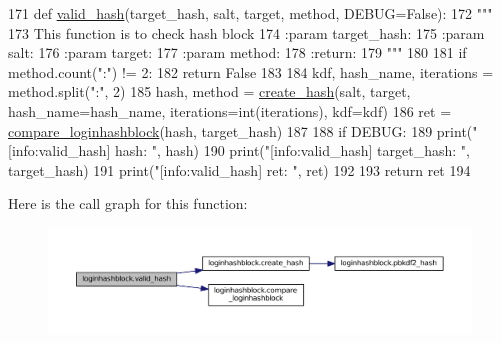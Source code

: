 \begin{DoxyCode}
171 \textcolor{keyword}{def }\hyperlink{namespaceloginhashblock_ac7faa165bc305e611390727f11946424}{valid\_hash}(target\_hash, salt, target, method, DEBUG=False):
172     \textcolor{stringliteral}{"""}
173 \textcolor{stringliteral}{    This function is to check hash block}
174 \textcolor{stringliteral}{    :param target\_hash:}
175 \textcolor{stringliteral}{    :param salt:}
176 \textcolor{stringliteral}{    :param target:}
177 \textcolor{stringliteral}{    :param method:}
178 \textcolor{stringliteral}{    :return:}
179 \textcolor{stringliteral}{    """}
180 
181     \textcolor{keywordflow}{if} method.count(\textcolor{stringliteral}{":"}) != 2:
182         \textcolor{keywordflow}{return} \textcolor{keyword}{False}
183 
184     kdf, hash\_name, iterations = method.split(\textcolor{stringliteral}{":"}, 2)
185     hash, method = \hyperlink{namespaceloginhashblock_a935d8ae1c51e50f9e5db6a1d5f02b1b8}{create\_hash}(salt, target, hash\_name=hash\_name, iterations=int(iterations), 
      kdf=kdf)
186     ret = \hyperlink{namespaceloginhashblock_ac24dd842eb90e0ede55e842d44148d5b}{compare\_loginhashblock}(hash, target\_hash)
187 
188     \textcolor{keywordflow}{if} DEBUG:
189         print(\textcolor{stringliteral}{"[info:valid\_hash]        hash: "}, hash)
190         print(\textcolor{stringliteral}{"[info:valid\_hash] target\_hash: "}, target\_hash)
191         print(\textcolor{stringliteral}{"[info:valid\_hash]         ret: "}, ret)
192 
193     \textcolor{keywordflow}{return} ret
194 
\end{DoxyCode}


Here is the call graph for this function\+:\nopagebreak
\begin{figure}[H]
\begin{center}
\leavevmode
\includegraphics[width=350pt]{namespaceloginhashblock_ac7faa165bc305e611390727f11946424_cgraph}
\end{center}
\end{figure}



